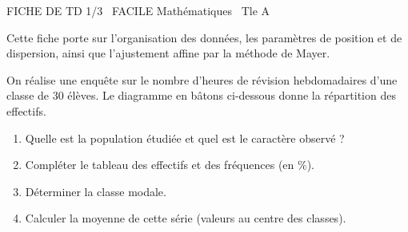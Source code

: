 \documentclass[11pt]{article}
\begin{document}
\begin{tcolorbox}[enhanced,colback=popink,colframe=popink,arc=10pt,boxrule=0pt,left=12pt,right=12pt,top=9pt,bottom=9pt]
{\color{white}\popxbold\small FICHE DE TD 1/3 \textbullet\ FACILE \hfill Mathématiques \textbullet\ Tle A\par}
\end{tcolorbox}
\vspace{4pt}
Cette fiche porte sur l'organisation des données, les paramètres de position et de dispersion, ainsi que l'ajustement affine par la méthode de Mayer.

\begin{exercice}
On réalise une enquête sur le nombre d'heures de révision hebdomadaires d'une classe de 30 élèves. Le diagramme en bâtons ci-dessous donne la répartition des effectifs.
\begin{center}
\end{center}
\begin{enumerate}
    \item Quelle est la population étudiée et quel est le caractère observé ?
    \item Compléter le tableau des effectifs et des fréquences (en \%). 
    \item Déterminer la classe modale. 
    \item Calculer la moyenne de cette série (valeurs au centre des classes).
\end{enumerate}
\end{exercice}
\end{document}
